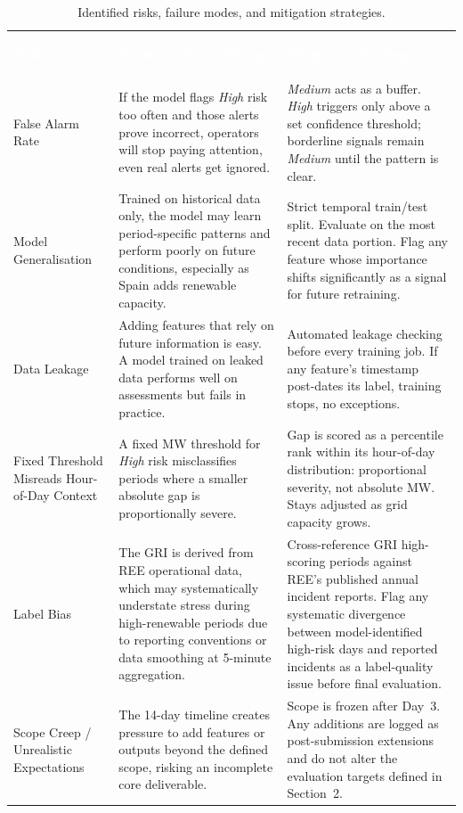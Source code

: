 \documentclass[11pt, a4paper]{article}
\begin{document}
\begin{table}[H]
\caption{Identified risks, failure modes, and mitigation strategies.}
\label{tab:risks}
\small
\setlength{\extrarowheight}{2pt}
\begin{tabularx}{\linewidth}{
  >{\bfseries\raggedright}P{3.5cm}
  P{5.6cm}
  P{5.6cm}}
\textcolor{white}{\textbf{Risk}} &
\textcolor{white}{\textbf{What Could Go Wrong}} &
\textcolor{white}{\textbf{Mitigation Strategy}} \\
False Alarm Rate &
If the model flags \textit{High} risk too often and those alerts prove
incorrect, operators will stop paying attention, even real alerts get
ignored. &
\textit{Medium} acts as a buffer. \textit{High} triggers only above a
set confidence threshold; borderline signals remain \textit{Medium} until
the pattern is clear. \\

Model Generalisation &
Trained on historical data only, the model may learn period-specific
patterns and perform poorly on future conditions, especially as Spain
adds renewable capacity. &
Strict temporal train/test split. Evaluate on the most recent data
portion. Flag any feature whose importance shifts significantly as a
signal for future retraining. \\

Data Leakage &
Adding features that rely on future information is easy. A model trained
on leaked data performs well on assessments but fails in practice. &
Automated leakage checking before every training job. If any feature's
timestamp post-dates its label, training stops, no exceptions. \\

Fixed Threshold Misreads Hour-of-Day Context &
A fixed MW threshold for \textit{High} risk misclassifies periods where
a smaller absolute gap is proportionally severe. &
Gap is scored as a percentile rank within its hour-of-day distribution:
proportional severity, not absolute MW. Stays adjusted as grid capacity
grows. \\
Label Bias &
The GRI is derived from REE operational data, which may systematically
understate stress during high-renewable periods due to reporting conventions
or data smoothing at 5-minute aggregation. &
Cross-reference GRI high-scoring periods against REE's published annual
incident reports. Flag any systematic divergence between model-identified
high-risk days and reported incidents as a label-quality issue before
final evaluation. \\

Scope Creep / Unrealistic Expectations &
The 14-day timeline creates pressure to add features or outputs beyond
the defined scope, risking an incomplete core deliverable. &
Scope is frozen after Day~3. Any additions are logged as post-submission
extensions and do not alter the evaluation targets defined in Section~2. \\
\end{tabularx}
\end{table}
\end{document}
